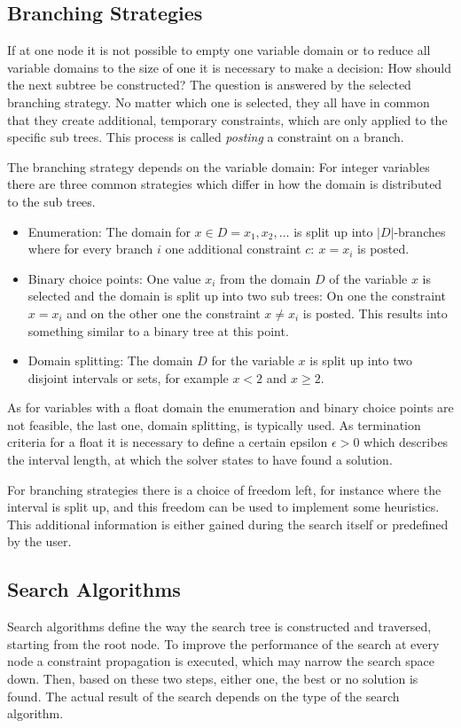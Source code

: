 \documentclass[10pt,
               a4paper,
               journal,
               ]{IEEEtran}
\begin{document}
		\subsection{Branching Strategies}
	If at one node it is not possible to empty one variable domain or to reduce all variable domains to the size of one it is necessary to make a decision: How should the next subtree be constructed? The question is answered by the selected branching strategy. No matter which one is selected, they all have in common that they create additional, temporary constraints, which are only applied to the specific sub trees. This process is called \emph{posting} a constraint on a branch.
	
	The branching strategy depends on the variable domain: For integer variables there are three common strategies \cite[p.~87]{handbookCP} which differ in how the domain is distributed to the sub trees.
	\begin{itemize}
		\item Enumeration: The domain for $x \in D = {x_1, x_2, \dots}$ is split up into $|D|$-branches where for every branch $i$ one additional constraint $c:\ x = x_i$ is posted.
		\item Binary choice points: One value $x_i$ from the domain $D$ of the variable $x$ is selected and the domain is split up into two sub trees: On one the constraint $x = x_i$ and on the other one the constraint $x \ne x_i$ is posted. This results into something similar to a binary tree at this point.
		\item Domain splitting: The domain $D$ for the variable $x$ is split up into two disjoint intervals or sets, for example $x < 2$ and $x \ge 2$.
	\end{itemize}
	
	As for variables with a float domain the enumeration and binary choice points are not feasible, the last one, domain splitting, is typically used. As termination criteria for a float it is necessary to define a certain epsilon $\epsilon > 0$ which describes the interval length, at which the solver states to have found a solution.
	
	For branching strategies there is a choice of freedom left, for instance where the interval is split up, and this freedom can be used to implement some heuristics. This additional information is either gained during the search itself or predefined by the user.
	
	\subsection{Search Algorithms}
	Search algorithms define the way the search tree is constructed and traversed, starting from the root node. To improve the performance of the search at every node a constraint propagation is executed, which may narrow the search space down. Then, based on these two steps, either one, the best or no solution is found. The actual result of the search depends on the type of the search algorithm.
	
\end{document}
